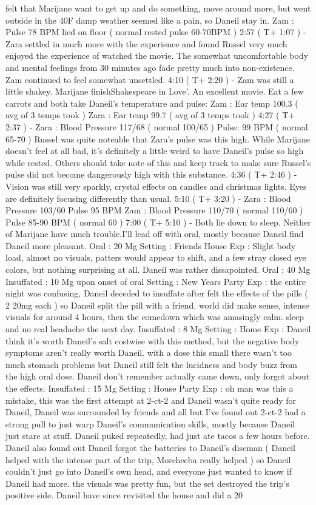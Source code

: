 \documentclass[12pt]{book}
\begin{document}
felt that Marijane want to get up and do something, move around more, but went outside in the 40F damp weather seemed like a pain, so Daneil stay in. Zam : Pulse 78 BPM lied on floor ( normal rested pulse 60-70BPM ) 2:57 ( T+ 1:07 ) - Zara settled in much more with the experience and found Russel very much enjoyed the experience of watched the movie. The somewhat uncomfortable body and mental feelings from 30 minutes ago fade pretty much into non-existence. Zam continued to feel somewhat unsettled. 4:10 ( T+ 2:20 ) - Zam was still a little shakey. Marijane finishShakespeare in Love'. An excellent movie. Eat a few carrots and both take Daneil's temperature and pulse: Zam : Ear temp 100.3 ( avg of 3 temps took ) Zara : Ear temp 99.7 ( avg of 3 temps took ) 4:27 ( T+ 2:37 ) - Zara : Blood Pressure 117/68 ( normal 100/65 ) Pulse: 99 BPM ( normal 65-70 ) Russel was quite noteable that Zara's pulse was this high. While Marijane doesn't feel at all bad, it's definitely a little weird to have Daneil's pulse so high while rested. Others should take note of this and keep track to make sure Russel's pulse did not become dangerously high with this substance. 4:36 ( T+ 2:46 ) - Vision was still very sparkly, crystal effects on candles and christmas lights. Eyes are definitely focusing differently than usual. 5:10 ( T+ 3:20 ) - Zara : Blood Pressure 103/60 Pulse 95 BPM Zam : Blood Pressure 110/70 ( normal 110/60 ) Pulse 85-90 BPM ( normal 60 ) 7:00 ( T+ 5:10 ) - Both lie down to sleep. Neither of Marijane have much trouble.I'll lead off with oral, mostly because Daneil find Daneil more pleasant. Oral : 20 Mg Setting : Friends House Exp : Slight body load, almost no visuals, patters would appear to shift, and a few stray closed eye colors, but nothing surprising at all. Daneil was rather dissapointed. Oral : 40 Mg Insuffated : 10 Mg upon onset of oral Setting : New Years Party Exp : the entire night was confusing, Daneil deceded to insuffate after felt the effects of the pills ( 2 20mg each ) so Daneil split the pill with a friend. world did make sense, intense visuals for around 4 hours, then the comedown which was amasingly calm. sleep and no real headache the next day. Insuffated : 8 Mg Setting : Home Exp : Daneil think it's worth Daneil's salt costwise with this method, but the negative body symptoms aren't really worth Daneil. with a dose this small there wasn't too much stomach problems but Daneil still felt the lucidness and body buzz from the high oral dose. Daneil don't remember actually came down, only forgot about the effects. Insuffated : 15 Mg Setting : House Party Exp : oh man was this a mistake, this was the first attempt at 2-ct-2 and Daneil wasn't quite ready for Daneil, Daneil was surrounded by friends and all but I've found out 2-ct-2 had a strong pull to just warp Daneil's communication skills, mostly because Daneil just stare at stuff. Daneil puked repeatedly, had just ate tacos a few hours before. Daneil also found out Daneil forgot the batteries to Daneil's discman ( Daneil helped with the intense part of the trip, Morcheeba really helped ) so Daneil couldn't just go into Daneil's own head, and everyone just wanted to know if Daneil had more. the visuals was pretty fun, but the set destroyed the trip's positive side. Daneil have since revisited the house and did a 20 
\end{document}
